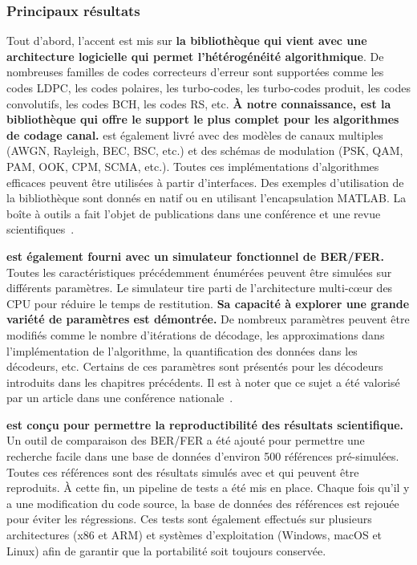 \subsubsection*{Principaux résultats}

Tout d'abord, l'accent est mis sur \textbf{la bibliothèque \AFFECT qui vient
avec une architecture logicielle qui permet l'hétérogénéité algorithmique}. De
nombreuses familles de codes correcteurs d'erreur sont supportées comme les
codes LDPC, les codes polaires, les turbo-codes, les turbo-codes produit, les
codes convolutifs, les codes BCH, les codes RS, etc. \textbf{À notre
connaissance, \AFFECT est la bibliothèque qui offre le support le plus complet
pour les algorithmes de codage canal.} \AFFECT est également livré avec des
modèles de canaux multiples (AWGN, Rayleigh, BEC, BSC, etc.) et des schémas de
modulation (PSK, QAM, PAM, OOK, CPM, SCMA, etc.). Toutes ces implémentations
d'algorithmes efficaces peuvent être utilisées à partir d'interfaces. Des
exemples d'utilisation de la bibliothèque sont donnés en natif \Cxx ou en
utilisant l'encapsulation MATLAB\R. La boîte à outils \AFFECT a fait l'objet de
publications dans une conférence et une revue scientifiques~\cite{Cassagne2017a,
Cassagne2019a}.

\textbf{\AFFECT est également fourni avec un simulateur fonctionnel de BER/FER.}
Toutes les caractéristiques précédemment énumérées peuvent être simulées sur
différents paramètres. Le simulateur tire parti de l'architecture multi-cœur des
CPU pour réduire le temps de restitution. \textbf{Sa capacité à explorer une
grande variété de paramètres est démontrée.} De nombreux paramètres peuvent être
modifiés comme le nombre d'itérations de décodage, les approximations dans
l'implémentation de l'algorithme, la quantification des données dans les
décodeurs, etc. Certains de ces paramètres sont présentés pour les décodeurs
introduits dans les chapitres précédents. Il est à noter que ce sujet a été
valorisé par un article dans une conférence nationale~\cite{Cassagne2017}.

\textbf{\AFFECT est conçu pour permettre la reproductibilité des résultats
scientifique.} Un outil de comparaison des BER/FER a été ajouté pour permettre
une recherche facile dans une base de données d'environ 500 références
pré-simulées. Toutes ces références sont des résultats simulés avec \AFFECT et
qui peuvent être reproduits. À cette fin, un pipeline de tests a été mis en
place. Chaque fois qu'il y a une modification du code source, la base de données
des références est rejouée pour éviter les régressions. Ces tests sont également
effectués sur plusieurs architectures (x86 et ARM\R) et systèmes d'exploitation
(Windows, macOS et Linux) afin de garantir que la portabilité soit toujours
conservée.

